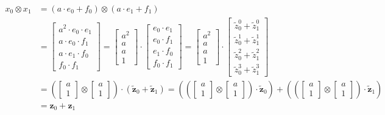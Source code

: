 \begin{equation}
\begin{aligned}
x_0 \otimes x_1 &= (a\cdot e_0 + f_0 ) \otimes (a \cdot e_1 + f_1) \\
    &= \begin{bmatrix} a^2 \cdot e_0 \cdot e_1 \\ a\cdot e_0 \cdot f_1 \\ a\cdot e_1 \cdot f_0 \\ f_0 \cdot f_1 \end{bmatrix} 
    = \begin{bmatrix}a^2 \\ a \\ a \\ 1\end{bmatrix} \cdot \begin{bmatrix}e_0 \cdot e_1 \\ e_0 \cdot f_1 \\ e_1 \cdot f_0 \\ f_0 \cdot f_1\end{bmatrix}
    = \begin{bmatrix}a^2 \\ a \\ a \\ 1\end{bmatrix} \cdot \begin{bmatrix}\tilde{z}^0_0 + \tilde{z}^0_1 \\ \tilde{z}^1_0 + \tilde{z}^1_1 \\ \tilde{z}^2_0 + \tilde{z}^2_1 \\ \tilde{z}^3_0 + \tilde{z}^3_1\end{bmatrix} \\
    &= \left(\begin{bmatrix}a \\ 1\end{bmatrix}\otimes\begin{bmatrix}a \\ 1\end{bmatrix}\right) \cdot \left(\tilde{\mathbf{z}}_0  + \tilde{\mathbf{z}}_1\right)
    = \left(\left(\begin{bmatrix}a \\ 1\end{bmatrix}\otimes\begin{bmatrix}a \\ 1\end{bmatrix}\right) \cdot \tilde{\mathbf{z}}_0\right)  +  \left(\left(\begin{bmatrix}a \\ 1\end{bmatrix}\otimes\begin{bmatrix}a \\ 1\end{bmatrix}\right) \cdot \tilde{\mathbf{z}}_1\right) \\
    &= \mathbf{z}_0 + \mathbf{z}_1
\end{aligned}
\label{eq:RingLPNPCGProof}
\end{equation}

